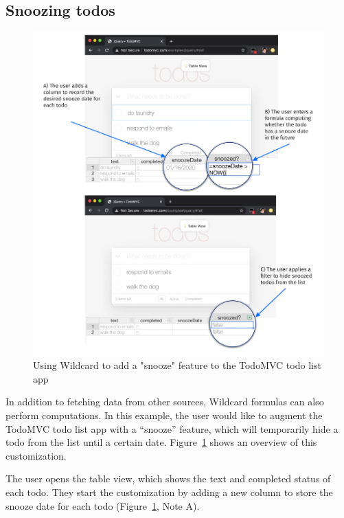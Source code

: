 \documentclass[sigplan,10pt,anonymous,review]{acmart}
\begin{document}
\hypertarget{snoozing-todos}{%
\subsection{Snoozing todos}\label{snoozing-todos}}

\begin{figure}
\hypertarget{fig:airbnb-demo}{%
\centering
\includegraphics{media/todomvc-demo-300dpi.png}
\caption{Using Wildcard to add a "snooze" feature to the TodoMVC todo list app}\label{fig:todomvc-demo}
}
\end{figure}

In addition to fetching data from other sources, Wildcard formulas can
also perform computations. In this example, the user would like to
augment the TodoMVC todo list app with a ``snooze'' feature, which will
temporarily hide a todo from the list until a certain date.{
Figure~\ref{fig:todomvc-demo} shows an overview of this customization.}

The user opens the table view, which shows the text and completed status
of each todo. They start the customization by adding a new column to
store the snooze date for each todo{ (Figure~\ref{fig:todomvc-demo},
Note A)}.
\end{document}
